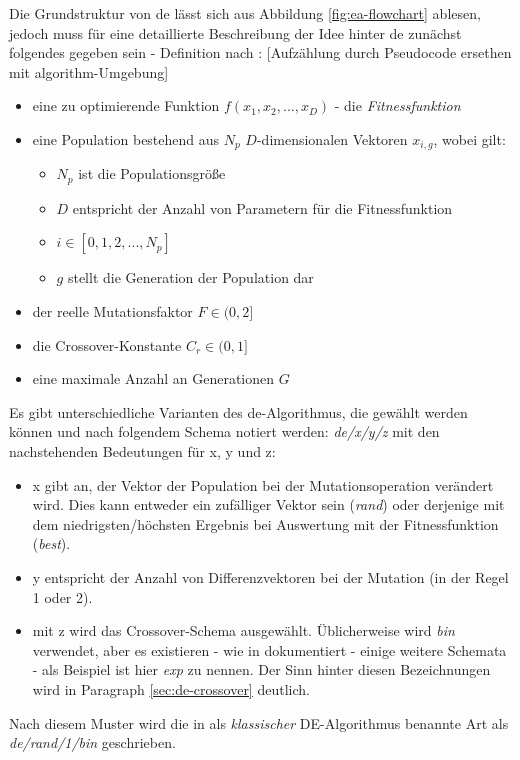 		Die Grundstruktur von \gls{de} lässt sich aus Abbildung 
		\ref{fig:ea-flowchart} ablesen, jedoch muss für eine detaillierte 
		Beschreibung der Idee hinter \gls{de} zunächst folgendes gegeben sein - 
		Definition nach \cite{storn-price-de}:
		\color{red} [Aufzählung durch Pseudocode ersethen mit algorithm-Umgebung] \color{black}
		\begin{itemize}
			\item eine zu optimierende Funktion $f(x_{1}, x_{2}, ... , x_{D})$ - die \textit{Fitnessfunktion}
			\item eine Population bestehend aus $N_{p}$ $D$-dimensionalen Vektoren $x_{i, g}$, wobei gilt:
			\begin{itemize}
				\item $N_{p}$ ist die Populationsgröße
				\item $D$ entspricht der Anzahl von Parametern für die Fitnessfunktion
				\item $i \in [0,1,2, ... , N_{p}]$
				\item $g$ stellt die Generation der Population dar
			\end{itemize}
			\item der reelle Mutationsfaktor $F \in (0,2]$
			\item die Crossover-Konstante $C_{r} \in (0,1]$
			\item eine maximale Anzahl an Generationen $G$
		\end{itemize}
		
		
		Es gibt unterschiedliche Varianten des \gls{de}-Algorithmus, die 
		gewählt werden können und nach folgendem Schema notiert werden: 
		\textit{\gls{de}/x/y/z} mit den nachstehenden Bedeutungen für x, y 
		und z:
		\begin{itemize}
			\item x gibt an, der Vektor der Population bei der 
			Mutationsoperation verändert wird. Dies kann entweder ein 
			zufälliger Vektor sein (\textit{rand}) oder derjenige mit dem 
			niedrigsten/höchsten Ergebnis bei Auswertung mit der 
			Fitnessfunktion (\textit{best}).
			\item y entspricht der Anzahl von Differenzvektoren bei der 
			Mutation (in der Regel 1 oder 2).
			\item mit z wird das Crossover-Schema ausgewählt. Üblicherweise 
			wird \textit{bin} verwendet, aber es existieren - wie in 
			\mbox{\cite[Seiten 93-97]{storn-price-de-book}} dokumentiert - 
			einige weitere Schemata - als Beispiel ist hier \textit{exp} zu 
			nennen. Der Sinn hinter diesen Bezeichnungen wird in Paragraph 
			\ref{sec:de-crossover} deutlich.
		\end{itemize}
		Nach diesem Muster wird die in \cite[Seite 47]{storn-price-de-book} 
		als \textit{klassischer} DE-Algorithmus benannte Art als 
		\textit{\gls{de}/rand/1/bin} geschrieben.\\
		
